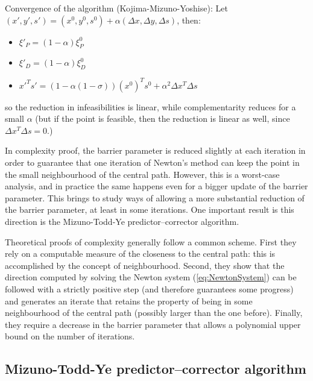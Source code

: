 
Convergence of the algorithm (Kojima-Mizuno-Yoshise): 
Let $(x', y', s') = (x^0, y^0, s^0) + \alpha(\Delta x, \Delta y, \Delta s)$, 
then:
\begin{itemize}
\item $\xi'_P = (1-\alpha) \xi^0_P$
\item $\xi'_D = (1-\alpha) \xi^0_D$
\item $x'^Ts' = (1-\alpha (1 -\sigma))(x^0)^Ts^0 +\alpha^2 \Delta x^T \Delta s$
\end{itemize}
so the reduction in infeasibilities is linear, while complementarity reduces
for a small $\alpha$ (but if the point is feasible, then the reduction is
linear as well, since $\Delta x^T \Delta s = 0$.)

In complexity proof, the barrier parameter is reduced slightly at
each iteration in order to guarantee that one iteration of Newton's
method can keep the point in the small neighbourhood of the central path.
However, this is a worst-case analysis, and in practice the same happens
even for a bigger update of the barrier parameter. This brings to
study ways of allowing a more substantial reduction of the barrier
parameter, at least in some iterations. One important result is this
direction is the Mizuno-Todd-Ye predictor--corrector algorithm.

\hrulefill

Theoretical proofs of complexity generally follow a common scheme.
First they rely on a computable measure of the closeness to the central
path: this is accomplished by the concept of neighbourhood. Second,
they show that the direction computed by solving the Newton system
(\ref{eq:NewtonSystem}) can be followed with a strictly positive step
(and therefore guarantees some progress) and generates an iterate 
that retains the property of being in some neighbourhood of the central 
path (possibly larger than the one before). Finally, they require
a decrease in the barrier parameter that allows a polynomial upper
bound on the number of iterations.

%
%
\subsection{Mizuno-Todd-Ye predictor--corrector algorithm}

